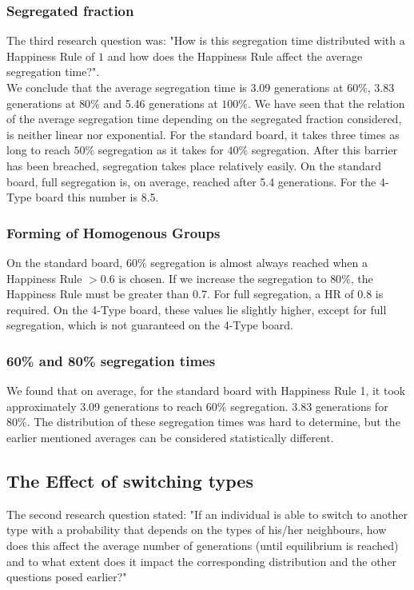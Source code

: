 \subsubsection*{Segregated fraction}
The third research question was: "How is this segregation time distributed with a Happiness Rule of \(1\) and how does the Happiness Rule affect the average segregation time?".\\
We conclude that the average segregation time  is 3.09 generations at \(60\%\), 3.83 generations at \(80\%\) and 5.46 generations at \(100\%\).
We have seen that the relation of the average segregation time depending on the segregated fraction considered, is neither linear nor exponential. For the standard board, it takes three times as long to reach $50\%$ segregation as it takes for $40\%$ segregation. After this barrier has been breached, segregation takes place relatively easily. On the standard board, full segregation is, on average, reached after 5.4 generations. For the 4-Type board this number is 8.5.

\subsubsection*{Forming of Homogenous Groups}
On the standard board, $60\%$ segregation is almost always reached when a Happiness Rule $>0.6$ is chosen. If we increase the segregation to $80\%$, the Happiness Rule must be greater than 0.7. For full segregation, a HR of 0.8 is required. On the 4-Type board, these values lie slightly higher, except for full segregation, which is not guaranteed on the 4-Type board.

\subsubsection*{60\% and 80\% segregation times}
We found that on average, for the standard board with Happiness Rule 1, it took approximately 3.09 generations to reach $60\%$ segregation. 3.83 generations for $80\%$. The distribution of these segregation times was hard to determine, but the earlier mentioned averages can be considered statistically different.

\subsection{The Effect of switching types}
The second research question stated: "If an individual is able to switch to another type with a probability that depends on the types of his/her neighbours, how does this affect the average number of generations (until equilibrium is reached) and to what extent does it impact the corresponding distribution and the other questions posed earlier?"\\

